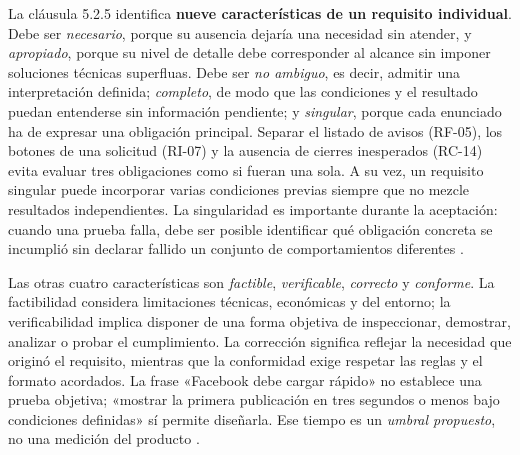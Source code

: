 \documentclass[11pt,a4paper]{article}
\begin{document}
La cláusula 5.2.5 identifica \textbf{nueve características de un requisito individual}. Debe ser \emph{necesario}, porque su ausencia dejaría una necesidad sin atender, y \emph{apropiado}, porque su nivel de detalle debe corresponder al alcance sin imponer soluciones técnicas superfluas. Debe ser \emph{no ambiguo}, es decir, admitir una interpretación definida; \emph{completo}, de modo que las condiciones y el resultado puedan entenderse sin información pendiente; y \emph{singular}, porque cada enunciado ha de expresar una obligación principal. Separar el listado de avisos (RF-05), los botones de una solicitud (RI-07) y la ausencia de cierres inesperados (RC-14) evita evaluar tres obligaciones como si fueran una sola. A su vez, un requisito singular puede incorporar varias condiciones previas siempre que no mezcle resultados independientes. La singularidad es importante durante la aceptación: cuando una prueba falla, debe ser posible identificar qué obligación concreta se incumplió sin declarar fallido un conjunto de comportamientos diferentes \cite{ISO29148}.

Las otras cuatro características son \emph{factible}, \emph{verificable}, \emph{correcto} y \emph{conforme}. La factibilidad considera limitaciones técnicas, económicas y del entorno; la verificabilidad implica disponer de una forma objetiva de inspeccionar, demostrar, analizar o probar el cumplimiento. La corrección significa reflejar la necesidad que originó el requisito, mientras que la conformidad exige respetar las reglas y el formato acordados. La frase «Facebook debe cargar rápido» no establece una prueba objetiva; «mostrar la primera publicación en tres segundos o menos bajo condiciones definidas» sí permite diseñarla. Ese tiempo es un \emph{umbral propuesto}, no una medición del producto \cite{ISO29148}.
\end{document}
